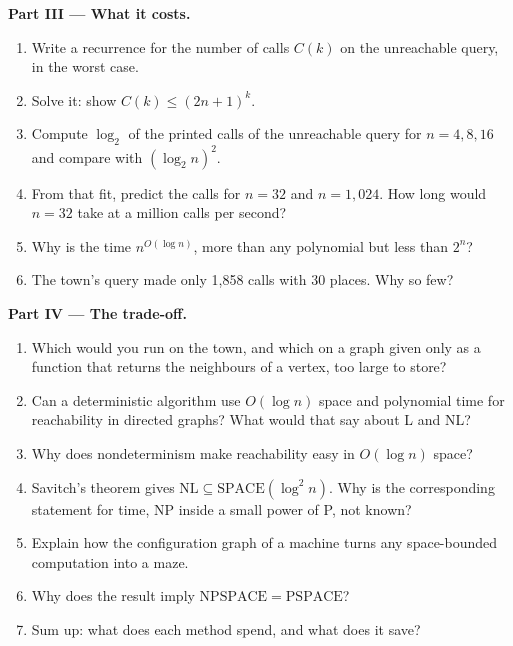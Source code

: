 \begin{problem}
\medskip\noindent\textbf{Part III --- What it costs.}
\begin{enumerate}[resume]
  \item Write a recurrence for the number of calls $C(k)$ on the unreachable query, in the worst case.
  \item Solve it: show $C(k) \le (2n + 1)^k$.
  \item Compute $\log_2$ of the printed calls of the unreachable query for $n = 4, 8, 16$ and compare with $(\log_2 n)^2$.
  \item From that fit, predict the calls for $n = 32$ and $n = 1{,}024$. How long would $n = 32$ take at a million calls per second?
  \item Why is the time $n^{O(\log n)}$, more than any polynomial but less than $2^n$?
  \item The town's query made only 1,858 calls with 30 places. Why so few?
\end{enumerate}

\medskip\noindent\textbf{Part IV --- The trade-off.}
\begin{enumerate}[resume]
  \item Which would you run on the town, and which on a graph given only as a function that returns the neighbours of a vertex, too large to store?
  \item Can a deterministic algorithm use $O(\log n)$ space and polynomial time for reachability in directed graphs? What would that say about L and NL?
  \item Why does nondeterminism make reachability easy in $O(\log n)$ space?
  \item Savitch's theorem gives $\mathrm{NL} \subseteq \mathrm{SPACE}(\log^2 n)$. Why is the corresponding statement for time, NP inside a small power of P, not known?
  \item Explain how the configuration graph of a machine turns any space-bounded computation into a maze.
  \item Why does the result imply $\mathrm{NPSPACE} = \mathrm{PSPACE}$?
  \item Sum up: what does each method spend, and what does it save?
\end{enumerate}
\end{problem}

